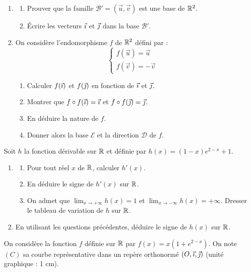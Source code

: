 \documentclass[11pt]{article}
\begin{document}
\begin{enumerate}
  \item \begin{enumerate}[label=\alph*.]
    \item Prouver que la famille $\mathcal{B}' = (\vec{u},\vec{v})$ est une base de $\mathbb{R}^2$.
    \item Écrire les vecteurs $\vec{\imath}$ et $\vec{\jmath}$ dans la base $\mathcal{B}'$.
  \end{enumerate}
  \item On considère l'endomorphisme $f$ de $\mathbb{R}^2$ défini par :
  \[ \begin{cases} f(\vec{u}) = \vec{u} \\ f(\vec{v}) = -\vec{v} \end{cases} \]
  \begin{enumerate}[label=\alph*.]
    \item Calculer $f(\vec{\imath})$ et $f(\vec{\jmath})$ en fonction de $\vec{\imath}$ et $\vec{\jmath}$.
    \item Montrer que $f \circ f(\vec{\imath}) = \vec{\imath}$ et $f \circ f(\vec{\jmath}) = \vec{\jmath}$.
    \item En déduire la nature de $f$.
    \item Donner alors la base $\mathcal{E}$ et la direction $\mathcal{D}$ de $f$.
  \end{enumerate}
\end{enumerate}


Soit $h$ la fonction dérivable sur $\mathbb{R}$ et définie par $h(x) = (1 - x)e^{2-x} + 1$.

\begin{enumerate}
  \item \begin{enumerate}[label=\alph*.]
    \item Pour tout réel $x$ de $\mathbb{R}$, calculer $h'(x)$.
    \item En déduire le signe de $h'(x)$ sur $\mathbb{R}$.
    \item On admet que $\displaystyle\lim_{x\to+\infty} h(x) = 1$ et $\displaystyle\lim_{x\to-\infty} h(x) = +\infty$. Dresser le tableau de variation de $h$ sur $\mathbb{R}$.
  \end{enumerate}
  \item En utilisant les questions précédentes, déduire le signe de $h(x)$ sur $\mathbb{R}$.
\end{enumerate}

On considère la fonction $f$ définie sur $\mathbb{R}$ par $f(x) = x(1 + e^{2-x})$. On note $(C)$ sa courbe représentative dans un repère orthonormé $(O,\vec{\imath},\vec{\jmath})$ (unité graphique : 1 cm).
\end{document}
